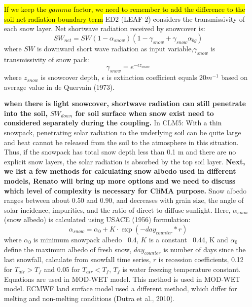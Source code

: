 \documentclass{article}
\begin{document}
\hl{If we keep the $gamma$ factor, we need to remember to add the difference to the soil net radiation boundary term}
ED2 (LEAF-2) considers the transmissivity of each snow layer.  Net shortwave radiation received by snowcover is:
\begin{equation}
SW_{net} = SW(1-\alpha_{snow})(1-\gamma_{snow}+\gamma_{snow}\alpha_{bg})
\end{equation}where $SW$ is downward short wave radiation as input variable,$\gamma_{snow}$ is transmissivity of snow pack: 
\begin{equation}
\gamma_{snow} = e^{-{\epsilon}z_{snow}}
\end{equation}
where $z_{snow}$ is snowcover depth, $\epsilon$ is extinction coefficient equals 20$m^{-1}$  based on average value in de Quervain (1973).

\textbf{when there is light snowcover, shortwave radiation can still penetrate into the soil, $SW_{down}$ for soil surface when snow exist need to considered separately during the coupling.}
In CLM5: With a thin snowpack, penetrating solar radiation to the underlying soil can be quite large and heat cannot be released from the soil to the atmosphere in this situation. Thus, if the snowpack has total snow depth less than 0.1 m and there are no explicit snow layers, the solar radiation is absorbed by the top soil layer.
\textbf{Next, we list a few methods for calculating snow albedo used in different models, Renato will bring up more options and we need to discuss which level of complexity is necessary for CliMA purpose.}
Snow albedo ranges between about 0.50 and 0.90, and decreases with grain size, the angle of solar incidence, impurities, and the ratio of direct to diffuse sunlight. Here, $\alpha_{snow}$ (snow albedo) is calculated using USACE (1956) formulation:
\begin{equation}
\alpha_{snow} = \alpha_0+K \cdot \exp(-day_{counter} * r)    
\end{equation}
where $\alpha_0$ is minimum snowpack albedo ~0.4, $K$ is a constant ~0.44, K and $\alpha_0$ define the maximum albedo of fresh snow, $day_{counter}$ is number of days since the last snowfall, calculate from snowfall time series, $r$ is recession coefficients, 0.12 for $T_{air}>T_f$ and 0.05 for $T_{air}<T_f$, $T_f$ is water freezing temperature constant. Equations are used in MOD-WET model. 
This method is used in MOD-WET model. 
ECMWF land surface model used a different method, which differ for melting and non-melting conditions (Dutra et al., 2010).
\end{document}
